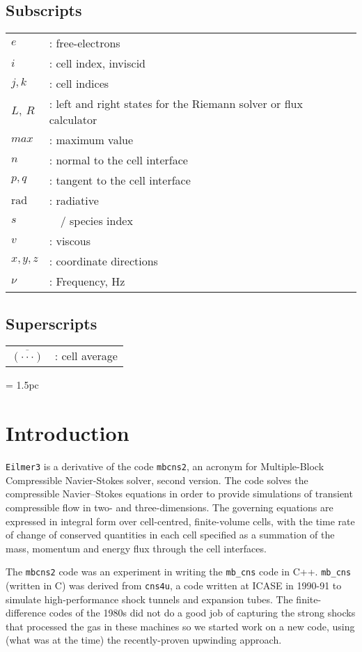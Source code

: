 \documentclass[12pt,a4paper,twoside]{article}
\begin{document}
\subsection*{Subscripts}
\begin{tabular}{ll}
$e$    & : free-electrons \\
$i$     & : cell index, inviscid \\
$j,k$	& : cell indices \\
$L,~R$	& : left and right states for the Riemann solver or flux calculator \\
$max$	& : maximum value \\
$n$        & : normal to the cell interface \\
$p,q$      & : tangent to the cell interface \\
$\text{rad}$  & : radiative \\
$s$	& ~~/ species index \\
$v$        & : viscous \\
$x,y,z$  & : coordinate directions \\
$\nu$    & : Frequency, Hz
\end{tabular}


\subsection*{Superscripts}
\begin{tabular}{ll}
$\overline{(\cdot\cdot\cdot)}$ & : cell average \\
\end{tabular}


\clearpage
\baselineskip = 1.5pc

\section{Introduction}
%
\texttt{Eilmer3} is a derivative of the code \texttt{mbcns2}, 
an acronym for Multiple-Block Compressible Navier-Stokes solver, second version.  
The code solves the compressible Navier--Stokes equations in order to provide simulations 
of transient compressible flow in two- and three-dimensions.
The governing equations are expressed in integral form over cell-centred, finite-volume cells, 
with the time rate of change of conserved quantities in each cell specified as a summation of 
the mass, momentum and energy flux through the cell interfaces.  

\medskip
The \texttt{mbcns2} code was an experiment in writing the \texttt{mb\_cns} code in C++.
\texttt{mb\_cns} (written in C) was derived from \texttt{cns4u}, 
a code written at ICASE in 1990-91 to simulate high-performance shock tunnels and expansion tubes.
The finite-difference codes of the 1980s did not do a good job of capturing the strong
shocks that processed the gas in these machines so we started work on a new code, 
using (what was at the time) the recently-proven upwinding approach.
\end{document}
